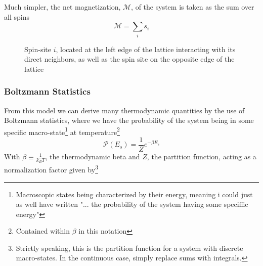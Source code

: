 \documentclass[10pt,showpacs,preprintnumbers,amsmath,amssymb,nofootinbib,aps,prl,twocolumn,groupedaddress,superscriptaddress,showkeys]{revtex4-1}
\begin{document}
    Much simpler, the net magnetization, $\mathcal M$, of the system is taken as the sum over all spins
    \begin{equation*}
      \mathcal M = \sum_i s_i
    \end{equation*}
      \begin{figure}[H]
      \centering
      \caption{Spin-site $i$, located at the left edge of the lattice interacting with its direct neighbors, as well as the spin site on the opposite edge of the lattice
      \label{fig:ising_periodic bounds}}
    \end{figure}

    \subsubsection{Boltzmann Statistics}
      From this model we can derive many thermodynamic quantities by the use of Boltzmann statistics, where we have the probability of the system being in some specific macro-state\footnote{Macroscopic states being characterized by their energy, meaning i could just as well have written "... the probability of the system having some speciffic energy"} at temperature\footnote{Contained within $\beta$ in this notation}
      \begin{equation}
        \mathcal P(E_s) = \frac{1}{Z} e^{-\beta E_s}
      \end{equation}
      With $\beta \equiv \frac{1}{k_B T}$, the thermodynamic beta and $Z$, the partition function, acting as a normalization factor given by\footnote{Strictly speaking, this is the partition function for a system with discrete macro-states. In the continuous case, simply replace sums with integrals.}
\end{document}
